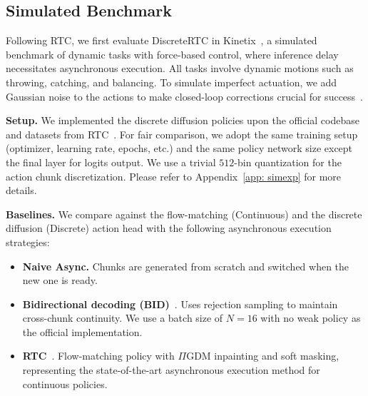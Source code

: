 \documentclass{article}
\begin{document}
\subsection{Simulated Benchmark}
\label{sec:exp_sim}

Following RTC, we first evaluate DiscreteRTC in Kinetix~\citep{matthews2024kinetix}, a simulated benchmark of dynamic tasks with force-based control, where inference delay necessitates asynchronous execution.
All tasks involve dynamic motions such as throwing, catching, and balancing.
To simulate imperfect actuation, we add Gaussian noise to the actions to make closed-loop corrections crucial for success~\citep{wang2026real}.

\textbf{Setup.}
We implemented the discrete diffusion policies upon the official codebase and datasets from RTC~\citep{wang2026real}.
For fair comparison, we adopt the same training setup (optimizer, learning rate, epochs, etc.) and the same policy network size except the final layer for logits output.
We use a trivial $512$-bin quantization for the action chunk discretization.
Please refer to Appendix~\ref{app: simexp} for more details.

\textbf{Baselines.} We compare against the flow-matching (Continuous) and the discrete diffusion (Discrete) action head with the following asynchronous execution strategies:
\begin{itemize}

    \item \textbf{Naive Async.} Chunks are generated from scratch and switched when the new one is ready.
    \item \textbf{Bidirectional decoding (BID)}~\citep{liu2024bidirectional}. Uses rejection sampling to maintain cross-chunk continuity. We use a batch size of $N = 16$ with no weak policy as the official implementation.
    \item \textbf{RTC}~\citep{black2025real}. Flow-matching policy with $\Pi$GDM inpainting and soft masking, representing the state-of-the-art asynchronous execution method for continuous policies.
\end{itemize}
\end{document}
